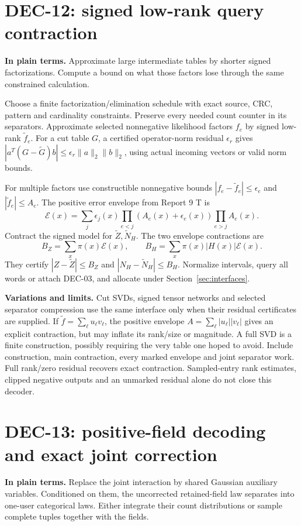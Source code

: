 \documentclass[10pt,a4paper]{article}
\begin{document}
\clearpage
\section{DEC-12: signed low-rank query contraction}
\label{sec:signed}
\textbf{In plain terms.} Approximate large intermediate tables by shorter signed factorizations.
Compute a bound on what those factors lose through the same constrained calculation.

Choose a finite factorization/elimination schedule with exact source, CRC, pattern and cardinality
constraints. Preserve every needed count counter in its separators.
Approximate selected nonnegative likelihood factors $f_e$ by signed low-rank $\widetilde f_e$.
For a cut table $G$, a certified operator-norm residual $\epsilon_r$ gives
$|a^T(G-\widetilde G)b|\leq\epsilon_r\|a\|_2\|b\|_2$, using actual incoming vectors or valid norm bounds.

For multiple factors use constructible nonnegative bounds
$|f_e-\widetilde f_e|\leq\epsilon_e$ and $|\widetilde f_e|\leq A_e$.
The positive error envelope from Report 9 T is
\[
 \mathcal E(x)=\sum_j\epsilon_j(x)
       \prod_{e<j}(A_e(x)+\epsilon_e(x))\prod_{e>j}A_e(x).
\]
Contract the signed model for $\widetilde Z,\widetilde N_H$.
The two envelope contractions are
\[
 B_Z=\sum_x\pi(x)\mathcal E(x),\qquad
 B_H=\sum_x\pi(x)|H(x)|\mathcal E(x).
\]
They certify $|Z-\widetilde Z|\leq B_Z$ and $|N_H-\widetilde N_H|\leq B_H$.
Normalize intervals, query all words or attach DEC-03, and allocate under Section~\ref{sec:interfaces}.

\textbf{Variations and limits.} Cut SVDs, signed tensor networks and selected separator compression use
the same interface only when their residual certificates are supplied.
If $\widetilde f=\sum_\ell u_\ell v_\ell$, the positive envelope
$A=\sum_\ell|u_\ell||v_\ell|$ gives an explicit contraction, but may inflate its rank/size or magnitude.
A full SVD is a finite construction, possibly requiring the very table one hoped to avoid.
Include construction, main contraction, every marked envelope and joint separator work.
Full rank/zero residual recovers exact contraction. Sampled-entry rank estimates, clipped negative
outputs and an unmarked residual alone do not close this decoder.

\clearpage
\section{DEC-13: positive-field decoding and exact joint correction}
\label{sec:fields}
\textbf{In plain terms.} Replace the joint interaction by shared Gaussian auxiliary variables.
Conditioned on them, the uncorrected retained-field law separates into one-user categorical laws.
Either integrate their count distributions or sample complete tuples together with the fields.
\end{document}
